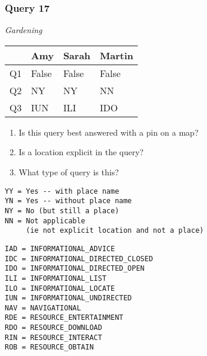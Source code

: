 \begin{frame}[fragile]
\frametitle{Query 17}
\vspace{1em}

\emph{Gardening}

\vfill

\begin{table}
  \centering
  \begin{tabular}{ l l l l }
    & \textbf{Amy} & \textbf{Sarah} & \textbf{Martin}\\
    \toprule
    Q1 & False & False & False\\
Q2 & NY & NY & NN\\
Q3 & IUN & ILI & IDO\\
    \bottomrule
  \end{tabular}
\end{table}

\vfill

\tiny{

\begin{enumerate}
\item Is this query best answered with a pin on a map?
\item Is a location explicit in the query?
\item What type of query is this?
\end{enumerate}

\vfill

\begin{multicols}{2}
\begin{verbatim}
YY = Yes -- with place name
YN = Yes -- without place name
NY = No (but still a place)
NN = Not applicable 
     (ie not explicit location and not a place)
\end{verbatim}

\columnbreak
\begin{verbatim}
IAD = INFORMATIONAL_ADVICE
IDC = INFORMATIONAL_DIRECTED_CLOSED
IDO = INFORMATIONAL_DIRECTED_OPEN
ILI = INFORMATIONAL_LIST
ILO = INFORMATIONAL_LOCATE
IUN = INFORMATIONAL_UNDIRECTED
NAV = NAVIGATIONAL
RDE = RESOURCE_ENTERTAINMENT
RDO = RESOURCE_DOWNLOAD
RIN = RESOURCE_INTERACT
ROB = RESOURCE_OBTAIN
\end{verbatim}
\end{multicols}
}

\end{frame}


